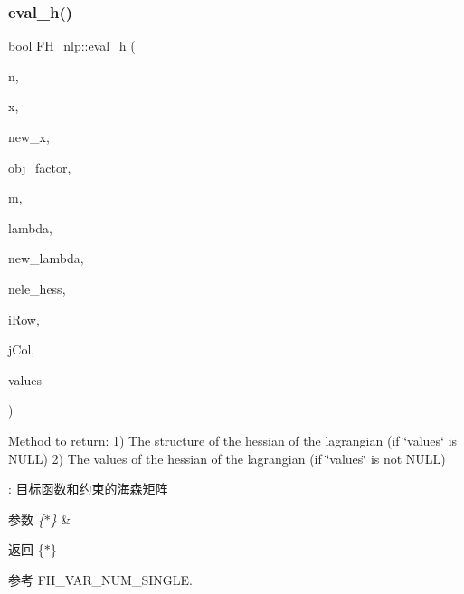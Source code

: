 \subsubsection{\texorpdfstring{eval\+\_\+h()}{eval\_h()}}
{\footnotesize\ttfamily bool F\+H\+\_\+nlp\+::eval\+\_\+h (\begin{DoxyParamCaption}\item[{Index}]{n,  }\item[{const Number $\ast$}]{x,  }\item[{bool}]{new\+\_\+x,  }\item[{Number}]{obj\+\_\+factor,  }\item[{Index}]{m,  }\item[{const Number $\ast$}]{lambda,  }\item[{bool}]{new\+\_\+lambda,  }\item[{Index}]{nele\+\_\+hess,  }\item[{Index $\ast$}]{i\+Row,  }\item[{Index $\ast$}]{j\+Col,  }\item[{Number $\ast$}]{values }\end{DoxyParamCaption})\hspace{0.3cm}{\ttfamily [virtual]}}

Method to return\+: 1) The structure of the hessian of the lagrangian (if \char`\"{}values\char`\"{} is N\+U\+LL) 2) The values of the hessian of the lagrangian (if \char`\"{}values\char`\"{} is not N\+U\+LL)

\+: 目标函数和约束的海森矩阵 
\begin{DoxyParams}{参数}
{\em \{$\ast$\}} & \\
\hline
\end{DoxyParams}
\begin{DoxyReturn}{返回}
\{$\ast$\} 
\end{DoxyReturn}


参考 F\+H\+\_\+\+V\+A\+R\+\_\+\+N\+U\+M\+\_\+\+S\+I\+N\+G\+LE.

\mbox{\label{classquadruped_1_1FH__nlp_adc432f17a942b28d5cd9ac261361692d}} 
